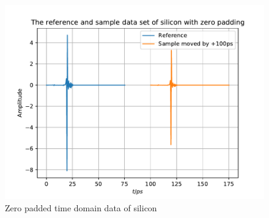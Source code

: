 \documentclass[aspectratio=1610, 9pt]{beamer}
\begin{document}
\begin{frame}
\begin{center}
\begin{columns}
\begin{column}{0.5\textwidth}
\begin{figure}
        \includegraphics[width=\textwidth]{silicon/THz_timedomain_zero.pdf}
        \caption{Zero padded time domain data of silicon}
        \end{figure}
      \end{column}
    \end{columns}
  \end{center}
\end{frame}
\end{document}
